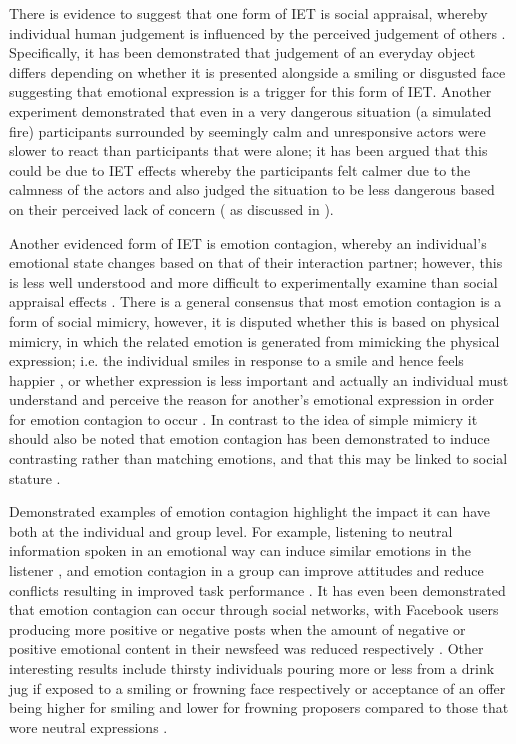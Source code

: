 \documentclass[11pt,a4paper]{report}
\begin{document}
There is evidence to suggest that one form of IET is social appraisal, whereby individual human judgement is influenced by the perceived judgement of others \cite{parkinson2011interpersonal}. Specifically, it has been demonstrated that judgement of an everyday object differs depending on whether it is presented alongside a smiling or disgusted face \cite{bayliss2007affective} suggesting that emotional expression is a trigger for this form of IET. Another experiment demonstrated that even in a very dangerous situation (a simulated fire) participants surrounded by seemingly calm and unresponsive actors were slower to react than participants that were alone; it has been argued that this could be due to IET effects whereby the participants felt calmer due to the calmness of the actors and also judged the situation to be less dangerous based on their perceived lack of concern (\cite{latane1968group} as discussed in \cite{parkinson2011interpersonal}).

Another evidenced form of IET is emotion contagion, whereby an individual's emotional state changes based on that of their interaction partner; however, this is less well understood and more difficult to experimentally examine than social appraisal effects \cite{parkinson2011interpersonal}. There is a general consensus that most emotion contagion is a form of social mimicry, however, it is disputed whether this is based on physical mimicry, in which the related emotion is generated from mimicking the physical expression; i.e. the individual smiles in response to a smile and hence feels happier \cite{strack1988inhibiting}, or whether expression is less important and actually an individual must understand and perceive the reason for another's emotional expression in order for emotion contagion to occur \cite{tamietto2009unseen}. In contrast to the idea of simple mimicry it should also be noted that emotion contagion has been demonstrated to induce contrasting rather than matching emotions, and that this may be linked to social stature \cite{tiedens2003power}.

Demonstrated examples of emotion contagion highlight the impact it can have both at the individual and group level. For example, listening to neutral information spoken in an emotional way can induce similar emotions in the listener \cite{neumann2000mood}, and emotion contagion in a group can improve attitudes and reduce conflicts resulting in improved task performance \cite{barsade2002ripple}. It has even been demonstrated that emotion contagion can occur through social networks, with Facebook users producing more positive or negative posts when the amount of negative or positive emotional content in their newsfeed was reduced respectively \cite{kramer2014experimental}. Other interesting results include thirsty individuals pouring more or less from a drink jug if exposed to a smiling or frowning face respectively \cite{winkielman2005unconscious} or acceptance of an offer being higher for smiling and lower for frowning proposers compared to those that wore neutral expressions \cite{mussel2013value}. 
\end{document}
